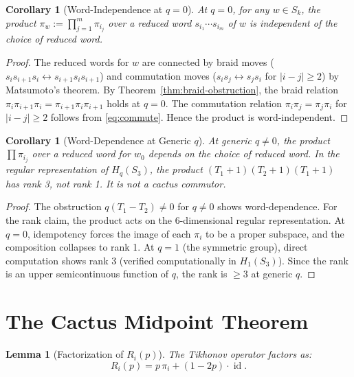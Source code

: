 \documentclass[11pt]{article}
\newtheorem{lemma}[theorem]{Lemma}
\newtheorem{corollary}[theorem]{Corollary}
\theoremstyle{definition}
\theoremstyle{remark}
\DeclareMathOperator{\id}{id}
\begin{document}
\begin{corollary}[Word-Independence at $q = 0$]\label{cor:word-indep}
At $q = 0$, for any $w \in S_k$, the product $\pi_w := \prod_{j=1}^m \pi_{i_j}$
over a reduced word $s_{i_1}\cdots s_{i_m}$ of $w$ is independent of the
choice of reduced word.
\end{corollary}

\begin{proof}
The reduced words for $w$ are connected by braid moves
($s_i s_{i+1} s_i \leftrightarrow s_{i+1} s_i s_{i+1}$) and commutation
moves ($s_i s_j \leftrightarrow s_j s_i$ for $|i-j| \geq 2$) by Matsumoto's
theorem. By Theorem~\ref{thm:braid-obstruction}, the braid relation
$\pi_i\pi_{i+1}\pi_i = \pi_{i+1}\pi_i\pi_{i+1}$ holds at $q = 0$.
The commutation relation $\pi_i\pi_j = \pi_j\pi_i$ for $|i-j| \geq 2$
follows from \eqref{eq:commute}. Hence the product is word-independent.
\end{proof}

\begin{corollary}[Word-Dependence at Generic $q$]\label{cor:word-dep}
At generic $q \neq 0$, the product $\prod \pi_{i_j}$ over a reduced word
for $w_0$ depends on the choice of reduced word. In the regular representation
of $H_q(S_3)$, the product $(T_1+1)(T_2+1)(T_1+1)$ has rank 3,
not rank 1. It is not a cactus commutor.
\end{corollary}

\begin{proof}
The obstruction $q(T_1 - T_2) \neq 0$ for $q \neq 0$ shows word-dependence.
For the rank claim, the product acts on the 6-dimensional regular
representation. At $q = 0$, idempotency forces the image of each $\pi_i$ to
be a proper subspace, and the composition collapses to rank 1. At $q = 1$
(the symmetric group), direct computation shows rank 3
(verified computationally in $H_1(S_3)$). Since the rank is an upper
semicontinuous function of $q$, the rank is $\geq 3$ at generic $q$.
\end{proof}

\section{The Cactus Midpoint Theorem}

\begin{lemma}[Factorization of $R_i(p)$]\label{lem:factorization}
The Tikhonov operator factors as:
\begin{equation}\label{eq:Rip-factor}
R_i(p) = p\,\pi_i + (1-2p)\cdot\id.
\end{equation}
\end{lemma}
\end{document}
